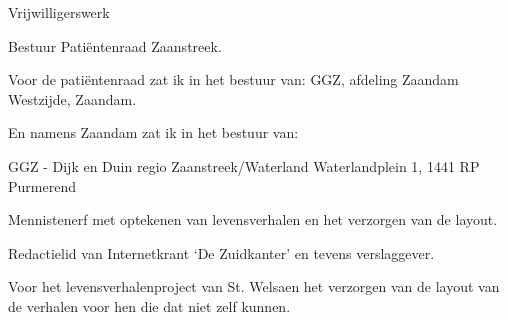 \documentclass[10pt,twoside,openright]{memoir}
\begin{document}
Vrijwilligerswerk

Bestuur Patiëntenraad Zaanstreek. 

Voor de patiëntenraad zat ik in het bestuur van:
GGZ, afdeling Zaandam Westzijde, Zaandam.

En namens Zaandam zat ik in het bestuur van:

GGZ - Dijk en Duin regio Zaanstreek/Waterland Waterlandplein 1, 1441 RP Purmerend

Mennistenerf met optekenen van levensverhalen en het verzorgen van de layout.

Redactielid van Internetkrant ‘De Zuidkanter’ en tevens verslaggever.

Voor het levensverhalenproject van St. Welsaen het verzorgen van de layout van de verhalen voor hen die dat niet zelf kunnen.
\end{document}
